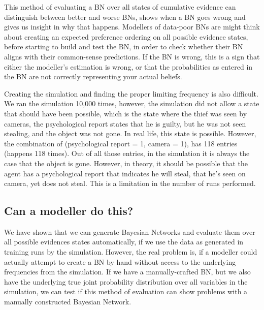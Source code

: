 \documentclass[12pt]{article}
\begin{document}
This method of evaluating a BN over all states of cumulative evidence can distinguish between better and worse BNs, shows when a BN goes wrong and gives us insight in why that happens. Modellers of data-poor BNs are might think about creating an expected preference ordering on all possible evidence states, before starting to build and test the BN, in order to check whether their BN aligns with their common-sense predictions. If the BN is wrong, this is a sign that either the modeller's estimation is wrong, or that the probabilities as entered in the BN are not correctly representing your actual beliefs.


Creating the simulation and finding the proper limiting frequency is also difficult. We ran the simulation 10,000 times, however, the simulation did not allow a state that should have been possible, which is the state where the thief was seen by cameras, the psychological report states that he is guilty, but he was not seen stealing, and the object was not gone. In real life, this state is possible. However, the combination of (psychological report = 1, camera = 1), has 118 entries (happens 118 times). Out of all those entries, in the simulation it is always the case that the object is gone. However, in theory, it should be possible that the agent has a psychological report that indicates he will steal, that he's seen on camera, yet does not steal. This is a limitation in the number of runs performed.




\subsection{Can a modeller do this?}


We have shown that we can generate Bayesian Networks and evaluate them over all possible evidences states automatically, if we use the data as generated in training runs by the simulation. However, the real problem is, if a modeller could actually attempt to create a BN by hand without access to the underlying frequencies from the simulation. If we have a manually-crafted BN, but we also have the underlying true joint probability distribution over all variables in the simulation, we can test if this method of evaluation can show problems with a manually constructed Bayesian Network. 
\end{document}
